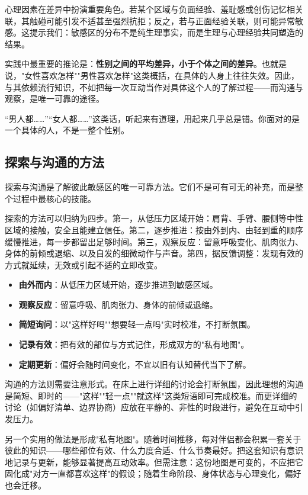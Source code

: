 \documentclass[12pt,UTF8]{ctexbook}
\newcommand{\keyword}[1]{\textbf{#1}}
\begin{document}
心理因素在差异中扮演重要角色。若某个区域与负面经验、羞耻感或创伤记忆相关联，其触碰可能引发不适甚至强烈抗拒；反之，若与正面经验关联，则可能异常敏感。这提示我们：敏感区的分布不是纯生理事实，而是生理与心理经验共同塑造的结果。

实践中最重要的推论是：\keyword{性别之间的平均差异，小于个体之间的差异}。也就是说，"女性喜欢怎样""男性喜欢怎样"这类概括，在具体的人身上往往失效。因此，与其依赖流行知识，不如把每一次互动当作对具体这个人的了解过程——而沟通与观察，是唯一可靠的途径。

\begin{tcolorbox}[colback=pink!5!white,colframe=red!50!black,title=贴心小叮咛]
	“男人都……”“女人都……”这类话，听起来有道理，用起来几乎总是错。你面对的是一个具体的人，不是一整个性别。
\end{tcolorbox}
\subsection{探索与沟通的方法}

探索与沟通是了解彼此敏感区的唯一可靠方法。它们不是可有可无的补充，而是整个过程中最核心的技能。

探索的方法可以归纳为四步。第一，从低压力区域开始：肩背、手臂、腰侧等中性区域的接触，安全且能建立信任。第二，逐步推进：按由外到内、由轻到重的顺序缓慢推进，每一步都留出足够时间。第三，观察反应：留意呼吸变化、肌肉张力、身体的前倾或退缩、以及自发的细微动作与声音。第四，据反馈调整：发现有效的方式就延续，无效或引起不适的立即改变。

\begin{itemize}
	\item \keyword{由外而内}：从低压力区域开始，逐步推进到敏感区域。
	\item \keyword{观察反应}：留意呼吸、肌肉张力、身体的前倾或退缩。
	\item \keyword{简短询问}：以"这样好吗""想要轻一点吗"实时校准，不打断氛围。
	\item \keyword{记录有效}：把有效的部位与方式记住，形成双方的"私有地图"。
	\item \keyword{定期更新}：偏好会随时间变化，不宜以旧有认知替代当下了解。
\end{itemize}

沟通的方法则需要注意形式。在床上进行详细的讨论会打断氛围，因此理想的沟通是简短、即时的——"这样""轻一点""就这样"这类短语即可完成校准。而更详细的讨论（如偏好清单、边界协商）应放在平静的、非性的时段进行，避免在互动中引发压力。

另一个实用的做法是形成"私有地图"。随着时间推移，每对伴侣都会积累一套关于彼此的知识——哪些部位有效、什么力度合适、什么节奏最好。把这套知识有意识地记录与更新，能够显著提高互动效率。但需注意：这份地图是可变的，不应把它固化成"对方一直都喜欢这样"的假设；随着生命阶段、身体状态与心理变化，偏好也会迁移。
\end{document}
